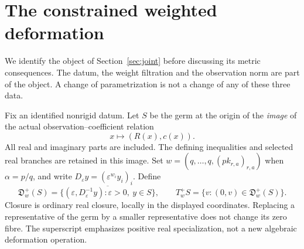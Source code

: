 \section{The constrained weighted deformation}\label{sec:canonical}
We identify the object of Section~\ref{sec:joint} before discussing its
metric consequences. The datum, the weight filtration and the observation
norm are part of the object. A change of parametrization is not a change
of any of these three data.

Fix an identified nonrigid datum. Let $S$ be the germ at the origin of the
\emph{image} of the actual observation--coefficient relation
\[
 x\longmapsto (R(x),c(x)).
\]
All real and imaginary parts are included. The defining inequalities and
selected real branches are retained in this image. Set
$w=(q,\ldots,q,(p k_{r,a})_{r,a})$ when $\alpha=p/q$, and write
$D_\varepsilon y=(\varepsilon^{w_i}y_i)_i$. Define
\begin{equation}\label{eq:real-deformation}
 \mathfrak D_w^+(S)=
 \overline{\{(\varepsilon,D_\varepsilon^{-1}y):
           \varepsilon>0,\ y\in S\}},\qquad
 T_w^+S=\{v:(0,v)\in\mathfrak D_w^+(S)\}.
\end{equation}
Closure is ordinary real closure, locally in the displayed coordinates.
Replacing a representative of the germ by a smaller representative does
not change its zero fibre. The superscript emphasizes positive real
specialization, not a new algebraic deformation operation.

